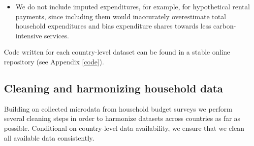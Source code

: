 \documentclass[12pt, a4paper]{article}
\begin{document}
\begin{refsection}
\begin{itemize}
    \item We do not include imputed expenditures, for example, for hypothetical rental payments, since including them would inaccurately overestimate total household expenditures and bias expenditure shares towards less carbon-intensive services.
\end{itemize}

Code written for each country-level dataset can be found in a stable online repository (see Appendix \ref{code}).

\subsection{Cleaning and harmonizing household data}\label{sec:cleaning_2}

Building on collected microdata from household budget surveys we perform several cleaning steps in order to harmonize datasets across countries as far as possible. Conditional on country-level data availability, we ensure that we clean all available data consistently. 


\end{refsection}
\end{document}
